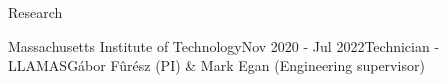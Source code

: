 \documentclass{resume} %
\begin{document}
\begin{rSection}{Research}
\begin{rSubsection}{Massachusetts Institute of Technology}{Nov 2020 - Jul 2022}{Technician - LLAMAS}{G\'abor F\^ur\'esz (PI) \& Mark Egan (Engineering supervisor)}
\end{rSubsection}


\end{rSection}
\end{document}
